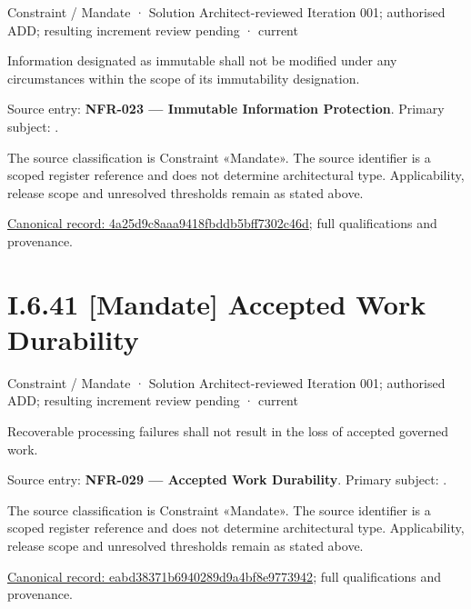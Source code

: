 \label{element:4a25d9c8aaa9418fbddb5bff7302c46d}
{\small Constraint / Mandate · Solution Architect-reviewed Iteration 001; authorised ADD; resulting increment review pending · current}\par

Information designated as immutable shall not be modified under any circumstances within the scope of its immutability designation.



Source entry: \textbf{NFR-023 — Immutable Information Protection}. Primary subject: \texttt{}.



The source classification is Constraint «Mandate». The source identifier is a scoped register reference and does not determine architectural type. Applicability, release scope and unresolved thresholds remain as stated above.


{\footnotesize \href{../../../../../../../continuum/motivation/constraint/mandate/4a25d9c8aaa9418fbddb5bff7302c46d.md}{Canonical record: 4a25d9c8aaa9418fbddb5bff7302c46d}; full qualifications and provenance.}\par
\section*{I.6.41 [Mandate] Accepted Work Durability}
\label{navigation:I.6.41}

\label{element:eabd38371b6940289d9a4bf8e9773942}
{\small Constraint / Mandate · Solution Architect-reviewed Iteration 001; authorised ADD; resulting increment review pending · current}\par

Recoverable processing failures shall not result in the loss of accepted governed work.



Source entry: \textbf{NFR-029 — Accepted Work Durability}. Primary subject: \texttt{}.



The source classification is Constraint «Mandate». The source identifier is a scoped register reference and does not determine architectural type. Applicability, release scope and unresolved thresholds remain as stated above.


{\footnotesize \href{../../../../../../../continuum/motivation/constraint/mandate/eabd38371b6940289d9a4bf8e9773942.md}{Canonical record: eabd38371b6940289d9a4bf8e9773942}; full qualifications and provenance.}\par
